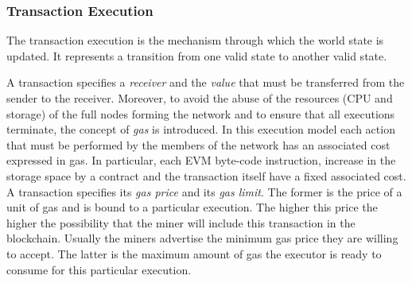\subsubsection{Transaction Execution}
\label{sec:tx-execution}

The transaction execution is the mechanism through which the world state is
updated. It represents a transition from one valid state to another valid state.

A transaction specifies a \emph{receiver} and the \emph{value} that must be
transferred from the sender to the receiver. Moreover, to avoid the abuse of the
resources (CPU and storage) of the full nodes forming the network and to ensure
that all executions terminate, the concept of \emph{gas} is introduced. In
this execution model each action that must be performed by the members of the
network has an associated cost expressed in gas. In particular, each EVM
byte-code instruction, increase in the storage space by a contract and the
transaction itself have a fixed associated cost. A transaction specifies its
\emph{gas price} and its \emph{gas limit}. The former is the price of a unit
of gas and is bound to a particular execution. The higher this price the higher
the possibility that the miner will include this transaction in the blockchain.
Usually the miners advertise the minimum gas price they are willing to accept.
The latter is the maximum amount of gas the executor is ready to consume for
this particular execution.

